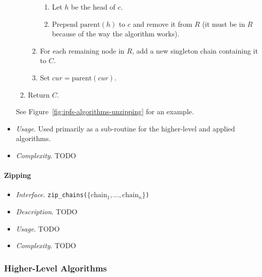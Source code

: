 \begin{itemize}
\begin{enumerate}
\begin{enumerate}
\begin{enumerate}

\item Let $h$ be the head of $c$.
\item Prepend $\mbox{parent}(h)$ to $c$ and remove it from $R$ (it must be in $R$ because of the way the algorithm works).

\end{enumerate}

\item For each remaining node in $R$, add a new singleton chain containing it to $C$.
\item Set $cur = \mbox{parent}(cur)$.

\end{enumerate}

\item Return $C$.

\end{enumerate}

See Figure~\ref{fig:ipfs-algorithms-unzipping} for an example.


\item \emph{Usage}. Used primarily as a sub-routine for the higher-level and applied algorithms.

\item \emph{Complexity}. TODO

\end{itemize}

\paragraph{Zipping}

\begin{itemize}

\item \emph{Interface}. \texttt{zip_chains($\{\mbox{chain}_1,\ldots,\mbox{chain}_n\}$)}

\item \emph{Description}. TODO

\item \emph{Usage}. TODO

\item \emph{Complexity}. TODO

\end{itemize}

\subsubsection{Higher-Level Algorithms}


